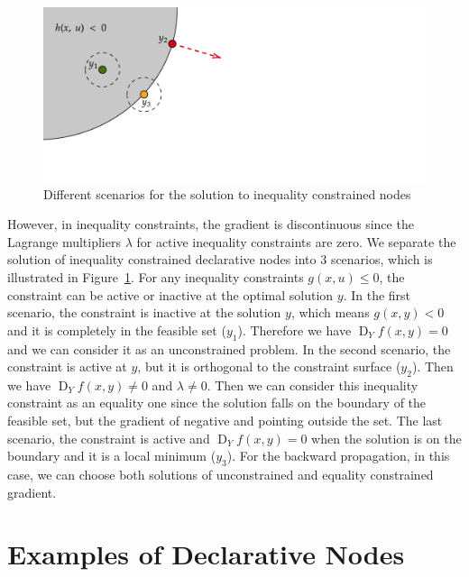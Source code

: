 \begin{figure}
    \label{fig:regular-point}
    \centering
    \includegraphics[]{figs/non-regular-scenario.pdf}
    \caption{Different scenarios for the solution to inequality constrained nodes~\citep{SG:19}}
\end{figure}

\par However, in inequality constraints, the gradient is discontinuous since the Lagrange multipliers $\lambda$ for active inequality constraints are zero. We separate the solution of inequality constrained declarative nodes into 3 scenarios, which is illustrated in Figure~\ref{fig:regular-point}. For any inequality constraints $g(x, u) \leq 0$, the constraint can be active or inactive at the optimal solution $y$. In the first scenario, the constraint is inactive at the solution $y$, which means $g(x,y) < 0$ and it is completely in the feasible set ($y_1$). Therefore we have $\operatorname{D}_Yf(x,y) = 0$ and we can consider it as an unconstrained problem. In the second scenario, the constraint is active at $y$, but it is orthogonal to the constraint surface ($y_2$). Then we have $\operatorname{D}_Yf(x,y) \neq 0$ and $\lambda \neq 0$. Then we can consider this inequality constraint as an equality one since the solution falls on the boundary of the feasible set, but the gradient of negative and pointing outside the set. The last scenario, the constraint is active and $\operatorname{D}_Yf(x,y) = 0$ when the solution is on the boundary and it is a local minimum ($y_3$). For the backward propagation, in this case, we can choose both solutions of unconstrained and equality constrained gradient. 

\section{Examples of Declarative Nodes}
\label{sec:example}
